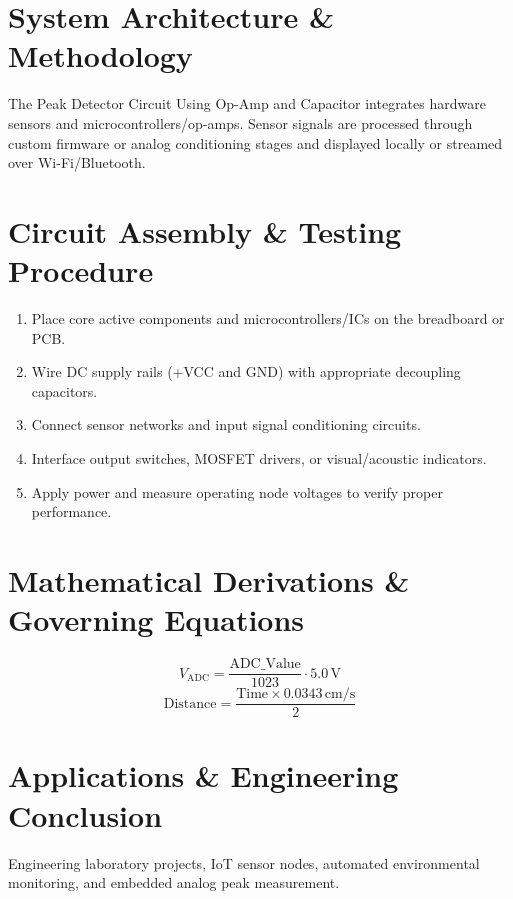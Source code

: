 \documentclass[11pt,a4paper]{article}
\begin{document}
\section{System Architecture \& Methodology}
The Peak Detector Circuit Using Op-Amp and Capacitor integrates hardware sensors and microcontrollers/op-amps. Sensor signals are processed through custom firmware or analog conditioning stages and displayed locally or streamed over Wi-Fi/Bluetooth.

\section{Circuit Assembly \& Testing Procedure}
\begin{enumerate}
    \item Place core active components and microcontrollers/ICs on the breadboard or PCB.
    \item Wire DC supply rails (+VCC and GND) with appropriate decoupling capacitors.
    \item Connect sensor networks and input signal conditioning circuits.
    \item Interface output switches, MOSFET drivers, or visual/acoustic indicators.
    \item Apply power and measure operating node voltages to verify proper performance.
\end{enumerate}

\section{Mathematical Derivations \& Governing Equations}
\begin{equation}
V_{\text{ADC}} = \frac{\text{ADC\_Value}}{1023} \cdot 5.0\,\text{V}
\end{equation}
\begin{equation}
\text{Distance} = \frac{\text{Time} \times 0.0343\,\text{cm/s}}{2}
\end{equation}

\section{Applications \& Engineering Conclusion}
Engineering laboratory projects, IoT sensor nodes, automated environmental monitoring, and embedded analog peak measurement.
\end{document}
